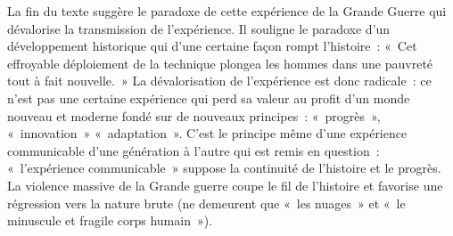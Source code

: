 {La fin du texte suggère le paradoxe de cette expérience de la Grande Guerre qui dévalorise
la transmission de l'expérience. Il souligne le paradoxe d'un développement historique qui d'une
certaine façon rompt l'histoire~: «~Cet effroyable déploiement de la technique plongea les hommes
dans une pauvreté tout à fait nouvelle.~» La dévalorisation de l'expérience est donc radicale~: ce
n'est pas une certaine expérience qui perd sa valeur au profit d'un monde nouveau et moderne
fondé sur de nouveaux principes~: «~progrès~», «~innovation~» «~adaptation~». C'est le principe
même d'une expérience communicable d'une génération à l'autre qui est remis en question~:
«~l'expérience communicable~» suppose la continuité de l'histoire et le progrès. La violence
massive de la Grande guerre coupe le fil de l'histoire et favorise une régression vers la nature
brute (ne demeurent que «~les nuages~» et «~le minuscule et fragile corps humain~»).}%
